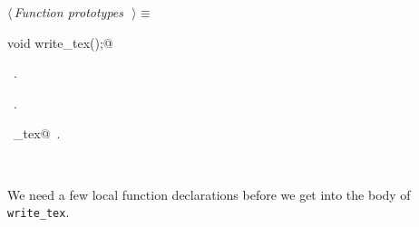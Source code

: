 \documentclass{report}
\begin{document}
\begin{flushleft} \small
\begin{minipage}{\linewidth} \label{scrap50}
$\langle\,${\it Function prototypes}\nobreak\ {\footnotesize {}}$\,\rangle\equiv$
\vspace{-1ex}
\begin{list}{}{} \item
\mbox{}\verb@extern void write_tex();@\\
\mbox{}\verb@@{\NWsep}
\end{list}
\vspace{-1ex}
\footnotesize\addtolength{\baselineskip}{-1ex}
\begin{list}{}{\setlength{\itemsep}{-\parsep}\setlength{\itemindent}{-\leftmargin}}
\item \NWtxtMacroDefBy\ .
\item \NWtxtMacroRefIn\ .
\end{list}
\vspace{-2ex}
\footnotesize\addtolength{\baselineskip}{-1ex}
\begin{list}{}{\setlength{\itemsep}{-\parsep}\setlength{\itemindent}{-\leftmargin}}
\item \NWtxtIdentsUsed\nobreak\  \verb@write_tex@\nobreak\ .\end{list}
\end{minipage}\\[4ex]
\end{flushleft}
We need a few local function declarations before we get into the body
of \verb|write_tex|.
\end{document}
